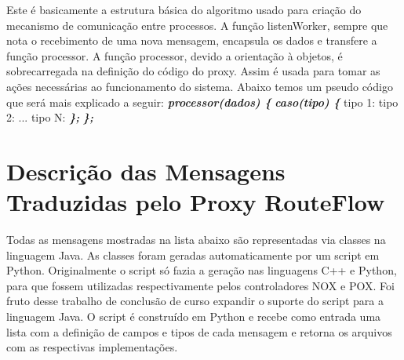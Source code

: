 Este é basicamente a estrutura básica do algoritmo usado
para criação do mecanismo de comunicação entre processos.
A função listenWorker, sempre que nota o recebimento de
uma nova mensagem, encapsula os dados e transfere a função 
processor. A função processor, devido a orientação à objetos,
é sobrecarregada na definição do código do proxy. Assim é usada
para tomar as ações necessárias ao funcionamento do sistema.
Abaixo temos um pseudo código que será mais explicado a seguir:
\newline
\newline
\noindent
{}
\newline
\textit{\textbf{processor(dados) \{}}
\newline
\newline
\indent
{}
\newline
\indent
\textit{\textbf{caso(tipo) \{}}
\newline
\indent
\indent
tipo 1: 
\newline
\indent
\indent
tipo 2: 
\newline
\indent
\indent
...
\newline
\indent
\indent
tipo N: 
\newline
\indent
\textit{\textbf{\};}}
\newline
\textit{\textbf{\};}}
\newline

\section{Descrição das Mensagens Traduzidas pelo Proxy RouteFlow}

Todas as mensagens mostradas na lista abaixo são representadas
via classes na linguagem Java. As classes foram geradas
automaticamente por um script em Python. Originalmente
o script só fazia a geração nas linguagens C++ e Python,
para que fossem utilizadas respectivamente pelos controladores
NOX e POX. Foi fruto desse trabalho de conclusão de curso
expandir o suporte do script para a linguagem Java. O script
é construído em Python e recebe como entrada uma lista com
a definição de campos e tipos de cada mensagem e retorna
os arquivos com as respectivas implementações. 

